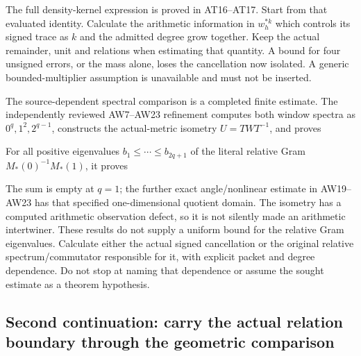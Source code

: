  

The full density-kernel expression is proved in AT16--AT17. Start from
that evaluated identity. Calculate the arithmetic information in
\(w_h^{*k}\) which controls its signed trace as \(k\) and the admitted
degree grow together. Keep the actual remainder, unit and relations when
estimating that quantity. A bound for four unsigned errors, or the mass
alone, loses the cancellation now isolated. A generic bounded-multiplier
assumption is unavailable and must not be inserted.

The source-dependent spectral comparison is a completed finite estimate.
The independently reviewed AW7--AW23 refinement computes both window
spectra as \(0^q,1^2,2^{q-1}\), constructs the actual-metric isometry
\(U=TWT^{-1}\), and proves


For all positive eigenvalues \(b_1\le\cdots\le b_{2q+1}\) of the literal
relative Gram \(M_*(0)^{-1}M_*(1)\), it proves


The sum is empty at \(q=1\); the further exact angle/nonlinear estimate
in AW19--AW23 has that specified one-dimensional quotient domain. The
isometry has a computed arithmetic observation defect, so it is not
silently made an arithmetic intertwiner. These results do not supply a
uniform bound for the relative Gram eigenvalues. Calculate either the
actual signed cancellation or the original relative spectrum/commutator
responsible for it, with explicit packet and degree dependence. Do not
stop at naming that dependence or assume the sought estimate as a
theorem hypothesis.

\subsection{Second continuation: carry the actual relation boundary
through the geometric
comparison}\label{TranscriptLedgerStage:second-continuation-carry-the-actual-relation-boundary-through-the-geometric-comparison}

